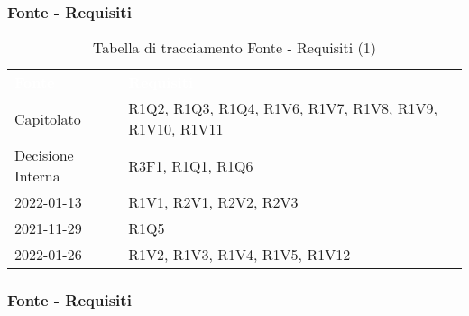 
\subsubsection{Fonte - Requisiti}


\begin{table}[!htbp]
\renewcommand{\arraystretch}{1.5}
\begin{tabular}{ m{}<{\centering}  m{}<{\centering} }
	\rowcolor{darkblue}
	\textcolor{white}{\textbf{Fonte}} &\textcolor{white}{\textbf{Requisiti}}\\ 

	Capitolato & R1Q2, R1Q3, R1Q4, R1V6, R1V7, R1V8, R1V9, R1V10, R1V11\\	

	Decisione Interna & R3F1, R1Q1, R1Q6 \\
	
	\Vi{} 2022-01-13 & R1V1, R2V1, R2V2, R2V3 \\
	
	\Vi{} 2021-11-29 & R1Q5 \\
	
	\Ve{} 2022-01-26 & R1V2, R1V3, R1V4, R1V5, R1V12 \\

\end{tabular}
\caption{Tabella di tracciamento Fonte - Requisiti (1)}
\end{table}

\pagebreak
\subsubsection{Fonte - Requisiti}

